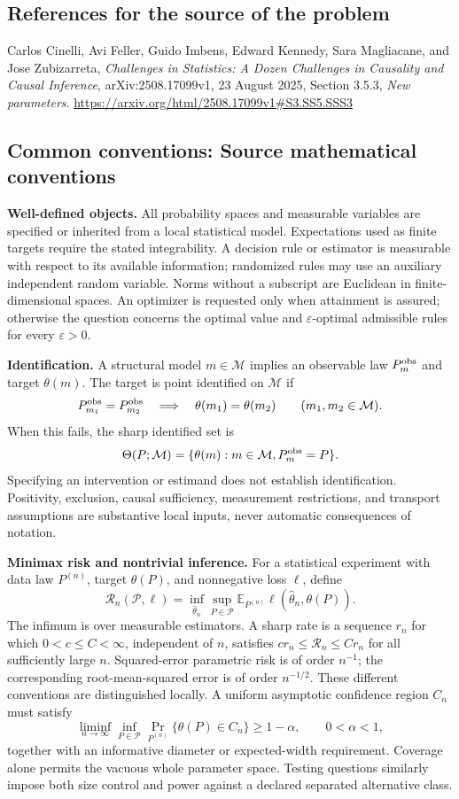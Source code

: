 \documentclass[11pt,a4paper]{article}
\newcommand{\E}{\mathbb E}
\begin{document}
\subsection*{References for the source of the problem}
Carlos Cinelli, Avi Feller, Guido Imbens, Edward Kennedy, Sara Magliacane, and Jose Zubizarreta, \emph{Challenges in Statistics: A Dozen Challenges in Causality and Causal Inference}, arXiv:2508.17099v1, 23 August 2025, Section 3.5.3, \emph{New parameters}.
\url{https://arxiv.org/html/2508.17099v1#S3.SS5.SSS3}

\subsection*{Common conventions: Source mathematical conventions}

\textbf{Well-defined objects.}
All probability spaces and measurable variables are specified or inherited
from a local statistical model. Expectations used as finite targets require
the stated integrability. A decision rule or estimator is measurable with
respect to its available information; randomized rules may use an auxiliary
independent random variable. Norms without a subscript are Euclidean in
finite-dimensional spaces. An optimizer is requested only when attainment
is assured; otherwise the question concerns the optimal value and
$\varepsilon$-optimal admissible rules for every $\varepsilon>0$.

\textbf{Identification.}
A structural model $m\in\mathcal M$ implies an observable law
$P_m^{\rm obs}$ and target $\theta(m)$. The target is point identified on
$\mathcal M$ if
\[
 P_{m_1}^{\rm obs}=P_{m_2}^{\rm obs}
 \quad\Longrightarrow\quad\theta(m_1)=\theta(m_2)
 \qquad(m_1,m_2\in\mathcal M).
\]
When this fails, the sharp identified set is
\[
 \Theta(P;\mathcal M)=\{\theta(m):m\in\mathcal M,
                                  P_m^{\rm obs}=P\}.
\]
Specifying an intervention or estimand does not establish identification.
Positivity, exclusion, causal sufficiency, measurement restrictions, and
transport assumptions are substantive local inputs, never automatic
consequences of notation.

\textbf{Minimax risk and nontrivial inference.}
For a statistical experiment with data law $P^{(n)}$, target $\theta(P)$,
and nonnegative loss $\ell$, define
\[
 \mathcal R_n(\mathcal P,\ell)
   =\inf_{\widehat\theta_n}\sup_{P\in\mathcal P}
      \E_{P^{(n)}}\ell(\widehat\theta_n,\theta(P)).
\]
The infimum is over measurable estimators. A sharp rate is a sequence
$r_n$ for which $0<c\leq C<\infty$, independent of $n$, satisfies
$c r_n\leq\mathcal R_n\leq C r_n$ for all sufficiently large $n$.
Squared-error parametric risk is of order $n^{-1}$; the corresponding
root-mean-squared error is of order $n^{-1/2}$. These different conventions
are distinguished locally. A uniform asymptotic confidence region $C_n$
must satisfy
\[
 \liminf_{n\to\infty}\inf_{P\in\mathcal P}
     \Pr_{P^{(n)}}\{\theta(P)\in C_n\}\geq 1-\alpha,
 \qquad 0<\alpha<1,
\]
together with an informative diameter or expected-width requirement.
Coverage alone permits the vacuous whole parameter space. Testing questions
similarly impose both size control and power against a declared separated
alternative class.
\end{document}
